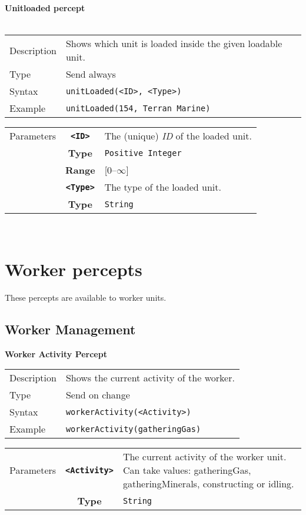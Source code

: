 \noindent
\textbf{Unitloaded percept}\\
\\
\begin{tabularx}{\textwidth}{lX}
 Description & Shows which unit is loaded inside the given loadable unit.\\
 Type & Send always \\
 Syntax & \verb|unitLoaded(<ID>, <Type>)| \\
 Example & \verb|unitLoaded(154, Terran Marine)| \\ 
 \end{tabularx}
 \begin{tabularx}{\textwidth}{l | c | p{8cm}|}
 \cline{2-3} 
 Parameters & \textbf{\verb|<ID>|} & The (unique) \textit{ID} of the loaded unit. \\
            & \textbf{Type} & \verb|Positive Integer| \\
            & \textbf{Range} & [0--$\infty$] \\
            \cline{2-3} 
            & \textbf{\verb|<Type>|} & The type of the loaded unit. \\
            & \textbf{Type} & \verb|String| \\
            \cline{2-3} 
\end{tabularx}\\

\section{Worker percepts}
These percepts are available to worker units.

\subsection{Worker Management}
\textbf{Worker Activity Percept}
\\
\begin{tabularx}{\textwidth}{lX}
 Description & Shows the current activity of the worker. \\
 Type & Send on change \\
 Syntax & \verb|workerActivity(<Activity>)| \\
 Example & \verb|workerActivity(gatheringGas)| \\ 
 \end{tabularx}
 \begin{tabularx}{\textwidth}{l | c | p{8cm}|}
 \cline{2-3} 
 Parameters  & \textbf{\verb|<Activity>|} & The current activity of the worker unit. Can take values: gatheringGas, gatheringMinerals, constructing or idling. \\
            & \textbf{Type} & \verb|String| \\
            \cline{2-3} 
\end{tabularx}\\
\\
\newpage
\noindent



